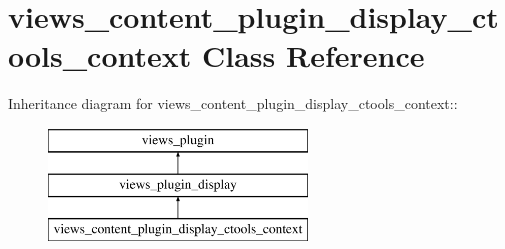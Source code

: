 \hypertarget{classviews__content__plugin__display__ctools__context}{
\section{views\_\-content\_\-plugin\_\-display\_\-ctools\_\-context Class Reference}
\label{classviews__content__plugin__display__ctools__context}
}
Inheritance diagram for views\_\-content\_\-plugin\_\-display\_\-ctools\_\-context::\begin{figure}[H]
\begin{center}
\leavevmode
\includegraphics[height=3cm]{classviews__content__plugin__display__ctools__context}
\end{center}
\end{figure}

